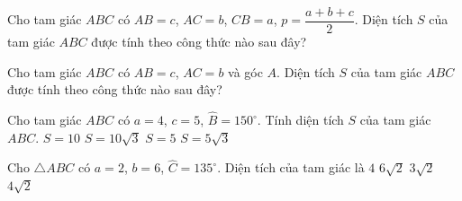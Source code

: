 

\begin{ex}%
	Cho tam giác $ABC$ có $AB=c$, $AC=b$, $CB=a$, $p=\dfrac{a+b+c}{2}$.  Diện tích $S$ của tam giác $ABC$ được tính theo công thức nào sau đây?
\end{ex}

\begin{ex}%
	Cho tam giác $ABC$ có $AB=c$, $AC=b$ và góc $A$. Diện tích $S$ của tam giác  $ABC$ được tính theo công thức nào sau đây?
\end{ex}

\begin{ex}%
	Cho tam giác $ABC$ có $a=4$, $c=5$, $\widehat{B}=150^\circ$. Tính diện tích $S$ của tam giác $ABC$. 
	\choice 
		{$S=10$} 
		 {$S=10\sqrt{3}$}
		{\True  $S=5$}
		 {$S=5\sqrt{3}$}
\end{ex}

\begin{ex}%
	Cho $\triangle ABC$ có $a=2$, $b=6$, $\widehat{C}=135^\circ$. Diện tích của tam giác là 
	\choice 
		 {$4$}
		 {$6\sqrt{2}$}
		{\True  $3\sqrt{2}$}
		{$4\sqrt{2}$} 
\end{ex}

